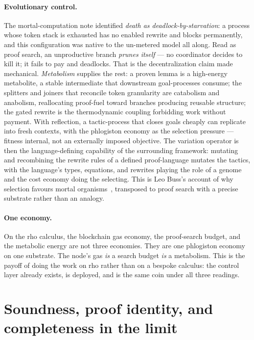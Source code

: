 \documentclass[11pt]{article}
\theoremstyle{plain}
\theoremstyle{definition}
\theoremstyle{remark}
\begin{document}
\paragraph{Evolutionary control.} The mortal-computation note identified
\emph{death as deadlock-by-starvation}: a process whose token stack is exhausted
has no enabled rewrite and blocks permanently, and this configuration was native
to the un-metered model all along. Read as proof search, an unproductive branch
\emph{prunes itself} --- no coordinator decides to kill it; it fails to pay and
deadlocks. That is the decentralization claim made mechanical. \emph{Metabolism}
supplies the rest: a proven lemma is a high-energy metabolite, a stable
intermediate that downstream goal-processes consume; the splitters and joiners
that reconcile token granularity are catabolism and anabolism, reallocating
proof-fuel toward branches producing reusable structure; the gated rewrite is
the thermodynamic coupling forbidding work without payment. With reflection, a
tactic-process that closes goals cheaply can replicate into fresh contexts, with
the phlogiston economy as the selection pressure --- fitness internal, not an
externally imposed objective. The variation operator is then the
language-defining capability of the surrounding framework: mutating and
recombining the rewrite rules of a defined proof-language mutates the tactics,
with the language's types, equations, and rewrites playing the role of a genome
and the cost economy doing the selecting. This is Leo Buss's account of why
selection favours mortal organisms~\cite{buss}, transposed to proof search with
a precise substrate rather than an analogy.

\paragraph{One economy.} On the rho calculus, the blockchain gas economy, the
proof-search budget, and the metabolic energy are not three economies. They are
one phlogiston economy on one substrate. The node's gas \emph{is} a search
budget \emph{is} a metabolism. This is the payoff of doing the work on rho rather
than on a bespoke calculus: the control layer already exists, is deployed, and
is the same coin under all three readings.

\section{Soundness, proof identity, and completeness in the limit}
\end{document}
